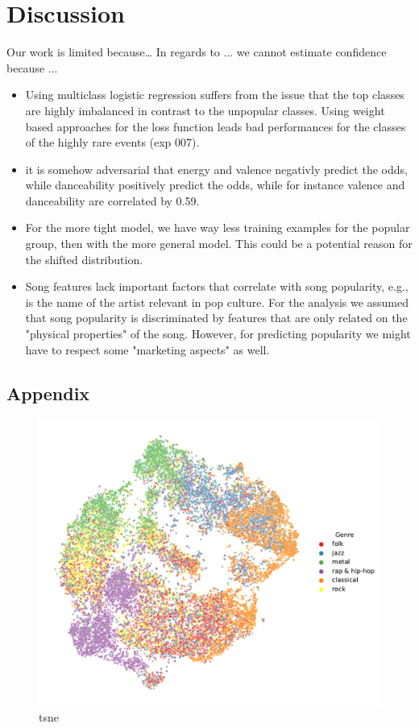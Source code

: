 \documentclass{article}
\begin{document}
\section{Discussion}
Our work is limited because\dots
In regards to ... we cannot estimate confidence because ...

\begin{itemize}
  \item Using multiclass logistic regression suffers from the issue that the top classes are highly imbalanced in contrast to the unpopular classes. Using weight based approaches for the loss function leads bad performances for the classes of the highly rare events (exp 007). 
  \item it is somehow adversarial that energy and valence negativly predict the odds, while danceability positively predict the odds, while for instance valence and danceability are correlated by 0.59.
\end{itemize}

\begin{itemize}
  \item For the more tight model, we have way less training examples for the popular group, then with the more general model. This could be a potential reason for the shifted distribution.
  \item Song features lack important factors that correlate with song popularity, e.g., is the name of the artist relevant in pop culture. For the analysis we assumed that song popularity is discriminated by features that are only related on the "physical properties" of the song. However, for predicting popularity we might have to respect some "marketing aspects" as well. 
\end{itemize}



\begin{appendix}
\section{Appendix}

\newpage

\begin{figure}
  \centering
  \includegraphics[width=1.0\textwidth]{../figures/tsne_genres.pdf}
  \caption{tsne}
  \label{fig:tsne_genres}
\end{figure}

\end{appendix}
\end{document}
